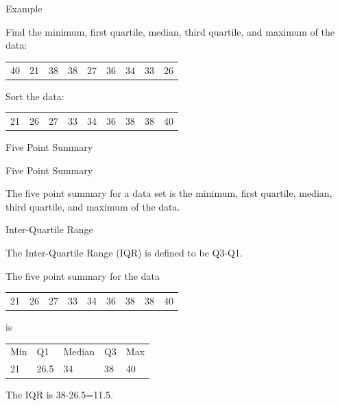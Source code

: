 \begin{frame}{Example}

  Find the minimum,  first quartile, median, third quartile, and
  maximum of the data:\\
  \begin{tabular}{lllllllll}
    40 & 21 & 38 & 38 & 27 & 36 & 34 & 33 & 26
  \end{tabular}

  {
    \vfill
    Sort the data: \\
    \begin{tabular}{lllllllll}
      21 & 26 & 27 & 33 & 34 & 36 & 38 & 38 & 40
    \end{tabular}
  }

  \vfill
  
\end{frame}


\begin{frame}{Five Point Summary}

  \begin{definition}{Five Point Summary}

    The five point summary for a data set is the minimum, first
    quartile, median, third quartile, and maximum of the data.
    
  \end{definition}

  \begin{definition}{Inter-Quartile Range}

    The Inter-Quartile Range (IQR) is defined to be Q3-Q1.
    
  \end{definition}




  {
    The five point summary for the data \
    \begin{tabular}{lllllllll}
      21 & 26 & 27 & 33 & 34 & 36 & 38 & 38 & 40
    \end{tabular}
    is \\
    \begin{tabular}{lllll}
      Min & Q1   & Median & Q3 & Max \\
      21  & 26.5 & 34     & 38 & 40
    \end{tabular}

    The IQR is 38-26.5=11.5.
  }

  
\end{frame}


